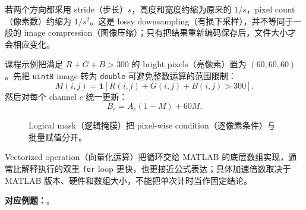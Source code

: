 若两个方向都采用 stride（步长）$s$，高度和宽度约缩为原来的 $1/s$，pixel count（像素数）约缩为 $1/s^2$。这是 lossy downsampling（有损下采样），并不等同于一般的 image compression（图像压缩）；只有把结果重新编码保存后，文件大小才会相应变化。


课程示例把满足 $R+G+B>300$ 的 bright pixels（亮像素）置为 $(60,60,60)$。先把 \texttt{uint8} image 转为 \texttt{double} 可避免整数运算的范围限制：
\[
  M(i,j)=\mathbf 1\!\left[R(i,j)+G(i,j)+B(i,j)>300\right].
\]
然后对每个 channel $c$ 统一更新：
\[
  B_c=A_c(1-M)+60M.
\]

\begin{figure}[htbp]
  \centering
  \resizebox{\textwidth}{!}{}
  \caption{Logical mask（逻辑掩膜）把 pixel-wise condition（逐像素条件）与批量赋值分开。}
  \label{fig:sc4061-l02-matlab-mask}
\end{figure}

Vectorized operation（向量化运算）把循环交给 MATLAB 的底层数组实现，通常比解释执行的双重 \texttt{for} loop 更快，也更接近公式表达；具体加速倍数取决于 MATLAB 版本、硬件和数组大小，不能把单次计时当作固定结论。

\textbf{对应例题：}。
